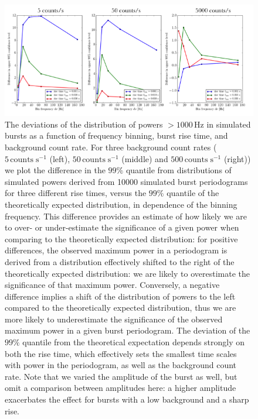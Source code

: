 \documentclass[numberedappendix]{emulateapj}
\newcommand{\hz}{\,\mathrm{Hz}}
\begin{document}
\begin{figure}[htbp]
\begin{center}
\includegraphics[width=18cm]{weak_burst_sims.png}
\caption{The deviations of the distribution of powers $>1000 \hz$ in simulated bursts as a function of frequency binning, burst rise time, and background count rate. For three background count rates ($5 \, \mathrm{counts} \; \mathrm{s}^{-1}$ (left), $50 \, \mathrm{counts} \; \mathrm{s}^{-1}$ (middle) and $500 \, \mathrm{counts} \; \mathrm{s}^{-1}$ (right)) we plot the difference in the $99\%$ quantile from distributions of simulated powers derived from 10000 simulated burst periodograms for three different rise times, versus the $99\%$ quantile of the theoretically expected distribution, in dependence of the binning frequency. This difference provides an estimate of how likely we are to over- or under-estimate the significance of a given power when comparing to the theoretically expected distribution: for positive differences, the observed maximum power in a periodogram is derived from a distribution effectively shifted to the right of the theoretically expected distribution: we are likely to overestimate the significance of that maximum power. Conversely, a negative difference implies a shift of the distribution of powers to the left compared to the theoretically expected distribution, thus we are more likely to underestimate the significance of the observed maximum power in a given burst periodogram. The deviation of the $99\%$ quantile from the theoretical expectation depends strongly on both the rise time, which effectively sets the smallest time scales with power in the periodogram, as well as the background count rate. Note that we varied the amplitude of the burst as well, but omit a comparison between amplitudes here: a higher amplitude exacerbates the effect for bursts with a low background and a sharp rise.}
\label{fig:weak_bursts}
\end{center}
\end{figure}
\end{document}
